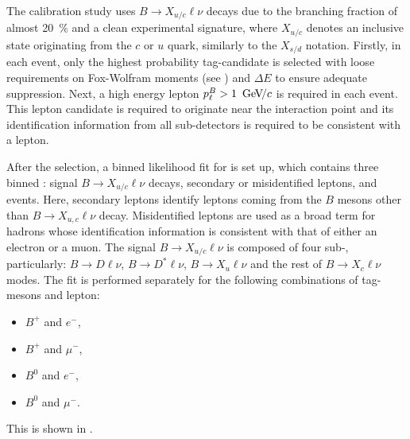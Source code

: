 The calibration study uses $B\rightarrow X_{u/c} \ell \nu$ decays due to the branching fraction of almost 20~\% and a clean experimental signature, 
where $X_{u/c}$ denotes an inclusive state originating from the $c$ or $u$ quark, similarly to the $X_{s/d}$ notation.
Firstly, in each event, only the highest \FEI probability tag-\B candidate is selected with loose requirements on Fox-Wolfram moments (see ) and $\Delta E$ to ensure adequate \epem\ra\qqbar suppression.
Next, a high energy lepton $p_{\ell}^B>1~{\mathrm{\,Ge\kern -0.1em V\!/}c}$ is required in each event.
This lepton candidate is required to originate near the interaction point and its identification information from all sub-detectors is required to be consistent with a lepton.

After the selection, a binned likelihood fit for \Mbc is set up, which contains three binned : signal $B\rightarrow X_{u/c}\ell\nu$ decays, 
secondary or misidentified leptons, and \epem\ra\qqbar events. 
Here, secondary leptons identify leptons coming from the $B$ mesons other than $B\rightarrow X_{u,c}\ell\nu$ decay.
Misidentified leptons are used as a broad term for hadrons whose identification information is consistent with that of either an electron or a muon.
The signal $B\rightarrow X_{u/c}\ell\nu$ \PDF is composed of four sub-, particularly: $B\rightarrow D\ell\nu$, $B\rightarrow D^*\ell\nu$, $B\rightarrow X_u\ell\nu$ and the rest of  $B\rightarrow X_c\ell\nu$ modes.
The fit is performed separately for the following combinations of tag-\B mesons and lepton:
\begin{itemize}
    \item $B^+$ and $e^-$,
    \item $B^+$ and $\mu^-$,
    \item $B^0$ and $e^-$,
    \item $B^0$ and $\mu^-$.
\end{itemize}
This is shown in .
